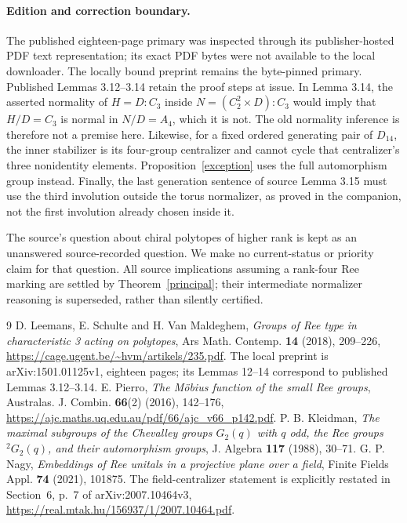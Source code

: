 \documentclass[11pt,a4paper]{article}
\begin{document}
\paragraph{Edition and correction boundary.}
The published eighteen-page primary was inspected through its
publisher-hosted PDF text representation; its exact PDF bytes were
not available to the local downloader. The locally bound preprint
remains the byte-pinned primary. Published Lemmas 3.12--3.14 retain
the proof steps at issue. In Lemma 3.14, the asserted normality of
$H=D:C_3$ inside $N=(C_2^2\times D):C_3$ would imply that
$H/D=C_3$ is normal in $N/D=A_4$, which it is not.
The old normality inference is therefore not a premise here.
Likewise, for a fixed ordered generating pair of $D_{14}$, the
inner stabilizer is its four-group centralizer and cannot cycle
that centralizer's three nonidentity elements. Proposition~\ref{exception}
uses the full automorphism group instead. Finally, the last
generation sentence of source Lemma 3.15 must use the third
involution outside the torus normalizer, as proved in the companion,
not the first involution already chosen inside it.

The source's question about chiral polytopes of higher rank is kept
as an unanswered source-recorded question. We make no current-status
or priority claim for that question. All source implications assuming
a rank-four Ree marking are settled by Theorem~\ref{principal};
their intermediate normalizer reasoning is superseded, rather than
silently certified.

\begin{thebibliography}{9}
 D. Leemans, E. Schulte and H. Van Maldeghem,
\emph{Groups of Ree type in characteristic 3 acting on polytopes},
Ars Math. Contemp. \textbf{14} (2018), 209--226,
\url{https://cage.ugent.be/~hvm/artikels/235.pdf}.
The local preprint is arXiv:1501.01125v1, eighteen pages;
its Lemmas 12--14 correspond to published Lemmas 3.12--3.14.
 E. Pierro, \emph{The M\"obius function of the small Ree groups},
Australas. J. Combin. \textbf{66}(2) (2016), 142--176,
\url{https://ajc.maths.uq.edu.au/pdf/66/ajc_v66_p142.pdf}.
 P. B. Kleidman, \emph{The maximal subgroups of the
Chevalley groups $G_2(q)$ with $q$ odd, the Ree groups ${}^2G_2(q)$,
and their automorphism groups}, J. Algebra \textbf{117} (1988), 30--71.
 G. P. Nagy, \emph{Embeddings of Ree unitals in a projective
plane over a field}, Finite Fields Appl. \textbf{74} (2021), 101875.
The field-centralizer statement is explicitly restated in Section~6,
p.~7 of arXiv:2007.10464v3,
\url{https://real.mtak.hu/156937/1/2007.10464.pdf}.
\end{thebibliography}
\end{document}
